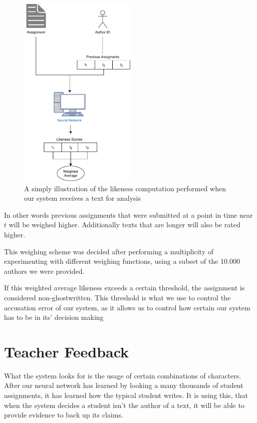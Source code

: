 \documentclass[11pt]{article}
\begin{document}
    \begin{figure}
    \centering
    \includegraphics[width=0.5\textwidth]{./pictures/Model}
    \caption{A simply illustration of the likeness computation performed
            when our system receives a text for analysis}
    \label{fig:model}
    \end{figure}


    In other words previous assignments that were submitted at a point
    in time near $t$ will be weighed higher. Additionally texts
    that are longer will also be rated higher.

    This weighing scheme was decided after performing a multiplicity of
    experimenting with different weighing functions, using a subset of the
    10.000 authors we were provided.

    If this weighted average likeness exceeds a certain threshold, the
    assignment is considered non-ghostwritten. This threshold
    is what we use to control the accusation error of our system,
    as it allows us to control how certain our system has to be in
    its' decision making

    \section{Teacher Feedback}

    What the system looks for is the usage of certain combinations of
    characters. After our neural network has learned by looking a many thousands
    of student assignments, it has learned how the typical student writes.
    It is using this, that when the system decides a student isn't the author
    of a text, it will be able to provide evidence to back up its claims.

    
\end{document}
